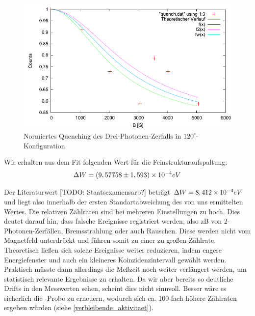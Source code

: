 \begin{figure}
 \includegraphics[width=\textwidth]{Auswertung/quench-normiert.pdf}
 \caption{Normiertes Quenching des Drei-Photonen-Zerfalls in $120^\circ$-Konfiguration}
 \label{auswertung-quench-normiert}
\end{figure}

Wir erhalten aus dem Fit folgenden Wert für die Feinstrukturaufspaltung:
\begin{equation*}
 \Delta W = (9,57758 \pm 1,593) \times 10^{-4} eV
\end{equation*}

Der Literaturwert [TODO: Staatsexamensarb?] beträgt $\Delta W = 8,412\times 10^{-4} eV$ und liegt also innerhalb der ersten Standartabweichung des von uns ermittelten Wertes. Die relativen Zählraten sind bei mehreren Einstellungen zu hoch. Dies deutet darauf hin, dass falsche Ereignisse registriert werden, also zB von 2-Photonen-Zerfällen, Bremsstrahlung oder auch Rauschen. Diese werden nicht vom Magnetfeld unterdrückt und führen somit zu einer zu großen Zählrate. Theoretisch ließen sich solche Ereignisse weiter reduzieren, indem engere Energiefenster und auch ein kleineres Koinzidenzintervall gewählt werden. Praktisch müsste dann allerdings die Meßzeit noch weiter verlängert werden, um statistisch relevante Ergebnisse zu erhalten. Da wir aber bereits so deutliche Drifts in den Messwerten sehen, scheint dies nicht sinnvoll. Besser wäre es sicherlich die \Na-Probe zu erneuern, wodurch sich ca. 100-fach höhere Zählraten ergeben würden (siehe \ref{verbleibende_aktivitaet}).